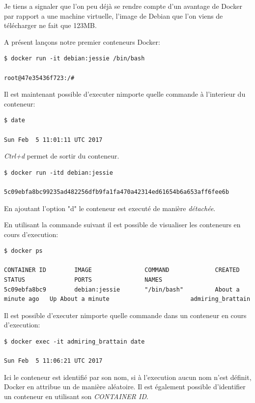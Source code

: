 Je tiens a signaler que l'on peu déjà se rendre compte d'un avantage de Docker par rapport a une machine virtuelle, l'image de Debian que l'on viens de télécharger ne fait que 123MB.

A présent lançons notre premier conteneurs Docker:

\begin{lstlisting}[frame=single]
$ docker run -it debian:jessie /bin/bash

root@47e35436f723:/# 
\end{lstlisting}

Il est maintenant possible d'executer nimporte quelle commande à l'interieur du conteneur:

\begin{lstlisting}[frame=single]
$ date

Sun Feb  5 11:01:11 UTC 2017
\end{lstlisting}

\emph{Ctrl+d} permet de sortir du conteneur.

\begin{lstlisting}[frame=single]
$ docker run -itd debian:jessie

5c09ebfa8bc99235ad482256dfb9fa1fa470a42314ed61654b6a653aff6fee6b
\end{lstlisting}

En ajoutant l'option "d" le conteneur est executé de manière \emph{détachée}.

En utilisant la commande suivant il est possible de visualiser les conteneurs en cours d'execution:

\begin{lstlisting}[frame=single]
$ docker ps

CONTAINER ID        IMAGE               COMMAND             CREATED              STATUS              PORTS               NAMES
5c09ebfa8bc9        debian:jessie       "/bin/bash"         About a minute ago   Up About a minute                       admiring_brattain
\end{lstlisting}

Il est possible d'executer nimporte quelle commande dans un conteneur en cours d'execution:

\begin{lstlisting}[frame=single]
$ docker exec -it admiring_brattain date

Sun Feb  5 11:06:21 UTC 2017
\end{lstlisting}

Ici le conteneur est identifié par son nom, si à l'execution aucun nom n'est définit, Docker en attribue un de manière aléatoire. Il est également possible d'identifier un conteneur en utilisant son \emph{CONTAINER ID}.

